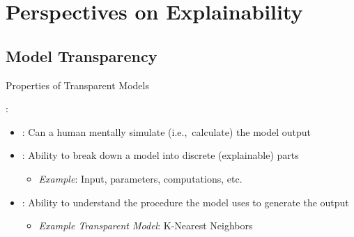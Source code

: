 \documentclass[11pt,dvipsnames,usenames,aspectratio=169]{beamer}  %
\begin{document}
\section{Perspectives on Explainability}
\subsection{Model Transparency}

\begin{frame}{Properties of Transparent Models}{}

  \vspace{20pt}
  :
  \begin{itemize}[<+->]
    \setlength{\itemsep}{12pt}
    \item {}: Can a human mentally simulate (i.e.,~calculate) the model output

    \item {}: Ability to break down a model into discrete (explainable) parts
      \begin{itemize}
        \item \textit{Example}: Input, parameters, computations, etc.
      \end{itemize}

    \item {}: Ability to understand the procedure the model uses to generate the output
      \begin{itemize}
        \item \textit{Example Transparent Model}: K-Nearest Neighbors
      \end{itemize}
  \end{itemize}
\end{frame}
\end{document}
